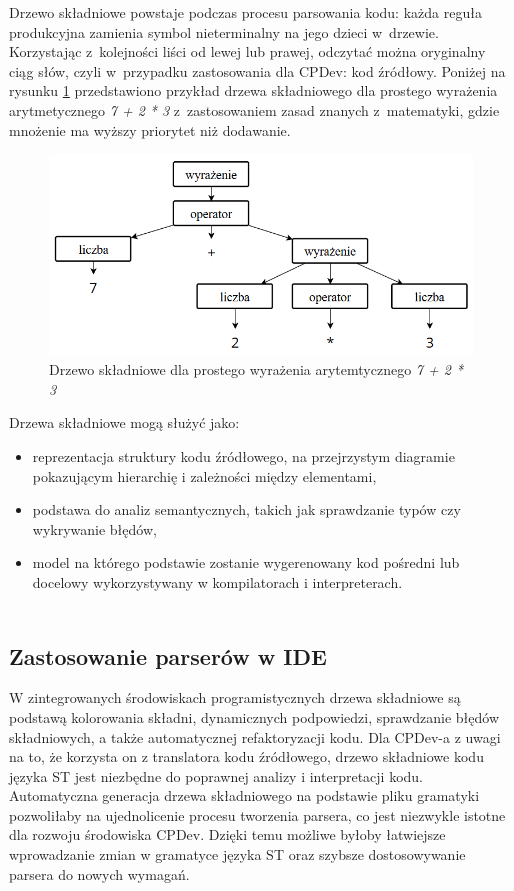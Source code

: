 \documentclass[12pt,twoside]{article}
\begin{document}
Drzewo składniowe powstaje podczas procesu parsowania kodu: każda reguła produkcyjna zamienia symbol nieterminalny na jego dzieci w~drzewie. Korzystając z~kolejności liści od lewej lub prawej, odczytać można oryginalny ciąg słów, czyli w~przypadku zastosowania dla CPDev: kod źródłowy. Poniżej na rysunku \ref{Fig:simpleGrammarTree} przedstawiono przykład drzewa składniowego dla prostego wyrażenia arytmetycznego \textit{7 + 2 * 3} z~zastosowaniem zasad znanych z~matematyki, gdzie mnożenie ma wyższy priorytet niż dodawanie.

\begin{figure}[ht]
   \centering
   \includegraphics[width=15cm]{images/grammarTreeSimple.png}
   \caption{Drzewo składniowe dla prostego wyrażenia arytemtycznego \textit{7 + 2 * 3}}
   \label{Fig:simpleGrammarTree}
\end{figure}

Drzewa składniowe mogą służyć jako:
\begin{itemize}[label=\textbullet, leftmargin=1.25cm]
   \item reprezentacja struktury kodu źródłowego, na przejrzystym diagramie pokazującym hierarchię i zależności między elementami,
   \item podstawa do analiz semantycznych, takich jak sprawdzanie typów czy wykrywanie błędów,
   \item model na którego podstawie zostanie wygerenowany kod pośredni lub docelowy wykorzystywany w kompilatorach i interpreterach.\\\\
\end{itemize}

\subsection{Zastosowanie parserów w IDE}
W zintegrowanych środowiskach programistycznych drzewa składniowe są podstawą kolorowania składni, dynamicznych podpowiedzi, sprawdzanie błędów składniowych, a także automatycznej refaktoryzacji kodu. Dla CPDev-a z uwagi na to, że korzysta on z translatora kodu źródłowego, drzewo składniowe kodu języka ST jest niezbędne do poprawnej analizy i interpretacji kodu. Automatyczna generacja drzewa składniowego na podstawie pliku gramatyki pozwoliłaby na ujednolicenie procesu tworzenia parsera, co jest niezwykle istotne dla rozwoju środowiska CPDev. Dzięki temu możliwe byłoby łatwiejsze wprowadzanie zmian w gramatyce języka ST oraz szybsze dostosowywanie parsera do nowych wymagań.
\clearpage
\end{document}
